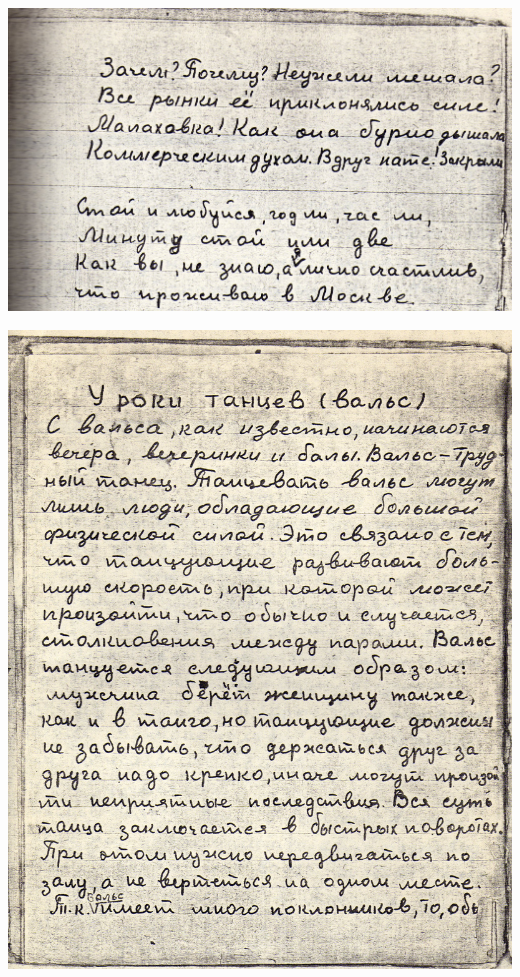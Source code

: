 \noindent
\includegraphics[width=\textwidth]{inc/Vynd/Vynd011}

\newpage


\noindent
\includegraphics[width=\textwidth]{inc/Vynd/Vynd012}

\newpage


